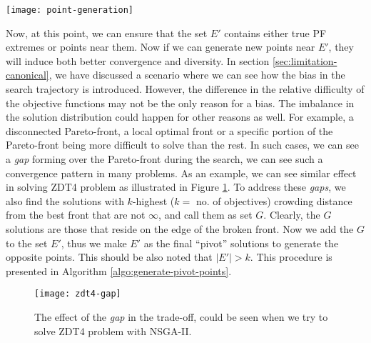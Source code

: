 \documentclass{sig-alternate-05-2015}
\begin{document}
\begin{figure*}[!hbp]
	\centering
	\texttt{[image: point-generation]}
	\caption{The illustration of lines 9--12 in Algorithm \ref{algo:onsga2}. The right axes are the variable space and the left axes are the corresponding objective space. The point \(\mathbf{x_c}\) is the child (black circle) and \(\mathbf{x_p}\) is the parent (white circle). The point \(\mathbf{v}\) are the pivot points (grey circles). The operation will choose one of the directions denoted by \(L_1\), \(L_2\) or \(L_3\). If \(\mathbf{x_c}\) violates the variable bound then it is reverted back to the vicinity of the corresponding pivot point \(\mathbf{v}\).}
	\label{fig:opposite-creation}
\end{figure*}
%
Now, at this point, we can ensure that the set \(E'\) contains either true PF extremes or points near them. Now if we can generate new points near \(E'\), they will induce both better convergence and diversity. In section \ref{sec:limitation-canonical}, we have discussed a scenario where we can see how the bias in the search trajectory is introduced. However, the difference in the relative difficulty of the objective functions may not be the only reason for a bias. The imbalance in the solution distribution could happen for other reasons as well. For example, a disconnected Pareto-front, a local optimal front or a specific portion of the Pareto-front being more difficult to solve than the rest. In such cases, we can see a \textit{gap} forming over the Pareto-front during the search, we can see such a convergence pattern in many problems. As an example, we can see similar effect in solving ZDT4 problem as illustrated in Figure \ref{fig:zdt4-gap-snapshot}. To address these \textit{gaps}, we also find the solutions with \(k\)-highest (\(k = \) no. of objectives) crowding distance from the best front that are not \(\infty\), and call them as set \(G\). Clearly, the \(G\) solutions are those that reside on the edge of the broken front. Now we add the \(G\) to the set \(E'\), thus we make \(E'\) as the final ``pivot'' solutions to generate the opposite points. This should be also noted that \(|E'| > k\). This procedure is presented in Algorithm \ref{algo:generate-pivot-points}.
\begin{figure}[tp]
	\centering
	\texttt{[image: zdt4-gap]}
	\caption{The effect of the \textit{gap} in the trade-off, could be seen when we try to solve ZDT4 problem with NSGA-II.}
	\label{fig:zdt4-gap-snapshot}
\end{figure}
%
%
\end{document}
